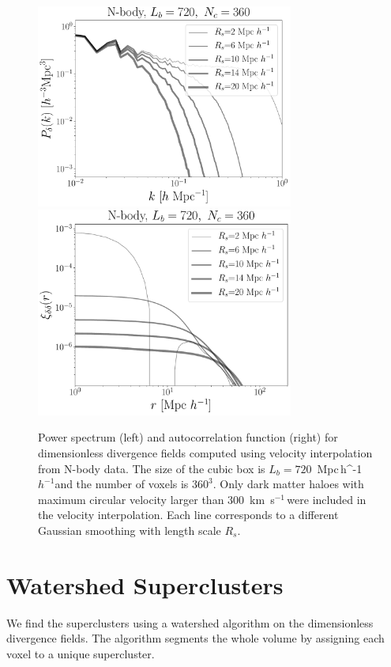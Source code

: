 \documentclass[usenatbib]{mnras}
\newcommand{\Mpch}{\,{\rm Mpc}\,\ifmmode h^{-1}\else $h^{-1}$\fi}
\newcommand{\kms}{\,{\rm km}\ s$^{-1}$\,}
\begin{document}
\begin{figure}
    \centering
    \includegraphics[width=240pt]{power_spectrum_nbody_720_360.pdf}
    \includegraphics[width=240pt]{corr_func_nbody_720_360.pdf} 
    \caption{Power spectrum (left) and autocorrelation function (right) for dimensionless divergence fields computed using velocity interpolation from N-body data.
    The size of the cubic box is $L_b=720$ \Mpch and the number of voxels is $360^3$.
    Only dark matter haloes with maximum circular velocity larger than $300$ \kms were included in the velocity interpolation.
    Each line corresponds to a different Gaussian smoothing with length scale $R_s$.}
    \label{fig:nbody}
\end{figure}



\section{Watershed Superclusters}
\label{sec:watershed}

We find the superclusters using a watershed algorithm \citep{beucher1993morphological} on the dimensionless divergence fields.
The algorithm segments the whole volume by assigning each voxel to a unique supercluster. 
\end{document}
